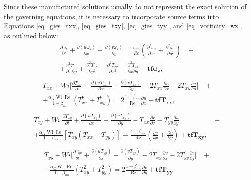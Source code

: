\documentclass[preprint, 12pt]{elsarticle}
\begin{document}
Since these manufactured solutions usually do not represent the exact solution of the governing equations, it is necessary to incorporate source terms into Equations \eqref{eq_gies_txx}, \eqref{eq_gies_txy}, \eqref{eq_gies_tyy}, and \eqref{eq_vorticity_wz}, as outlined below:
\begin{gather}
    \begin{aligned}
        \frac{\partial \omega_{z}}{\partial t} + \frac{\partial (u\omega_{z})}{\partial x} + \frac{\partial (v\omega_{z})}{\partial y} = \frac{\beta_{nn}}{Re}\left(\frac{\partial^{2} \omega_{z}}{\partial x^{2}} + \frac{\partial^{2} \omega_{z}}{\partial y^{2}}\right) &~+ \\ + \frac{\partial^{2}T_{xx}}{\partial x^{}\partial y^{}} + \frac{\partial^{2}T_{xy}}{\partial y^{2}} - \frac{\partial^{2}T_{xy}}{\partial x^{2}} - \frac{\partial^{2}T_{yy}}{\partial x^{}\partial y^{}} + \mathbf{tf}\boldsymbol{\omega}_{\mathbf{z}},\label{eq_vortic_corrent_MMS}
    \end{aligned}
\end{gather}
\begin{gather}
    \begin{aligned}
        T_{xx} + Wi\bigg[\frac{\partial T_{xx}}{\partial t} + \frac{\partial (uT_{xx})}{\partial x} + \frac{\partial (vT_{xx})}{\partial y} - 2T_{xx}\frac{\partial u}{\partial x} - 2T_{xy}\frac{\partial u}{\partial y}\bigg] &~+ \\ + \frac{\alpha_{G}\operatorname{Wi}\operatorname{Re}}{1-\beta_{nn}}\left(T_{xx}^{2} + T_{xy}^{2}\right) = 2\frac{1-\beta_{nn}}{\operatorname{Re}}\frac{\partial u}{\partial x} + \mathbf{tfT_{xx}},\label{eq_gies_txx_source_term_1}
    \end{aligned}
\end{gather}
\begin{gather}
    \begin{aligned}
        T_{xy} + Wi\bigg[\frac{\partial T_{xy}}{\partial t} + \frac{\partial (uT_{xy})} {\partial x} + \frac{\partial (vT_{xy})}{\partial y} - T_{xx}\frac{\partial v}{\partial x} - T_{yy}\frac{\partial u}{\partial y}\bigg] &~+ \\ + \frac{\alpha_{G}\operatorname{Wi}\operatorname{Re}}{1-\beta_{nn}}\left[T_{xy}\left(T_{xx} + T_{yy}\right)\right] = \frac{1-\beta_{nn}}{\operatorname{Re}}\left(\frac{\partial v}{\partial x} + \frac{\partial u}{\partial y}\right)+ \mathbf{tfT_{xy}},\label{eq_gies_txy_source_term_1}
    \end{aligned}
\end{gather}
\begin{gather}
    \begin{aligned}
        T_{yy} + Wi\bigg[\frac{\partial T_{yy}}{\partial t} + \frac{\partial (uT_{yy})}{\partial x} + \frac{\partial (vT_{yy})}{\partial y} - 2T_{xy}\frac{\partial v}{\partial x} - 2T_{yy}\frac{\partial v}{\partial y}\bigg] &~+ \\ + \frac{\alpha_{G}\operatorname{Wi}\operatorname{Re}}{1-\beta_{nn}}\left(T_{xy}^{2} + T_{yy}^{2}\right) = 2\frac{1-\beta_{nn}}{\operatorname{Re}}\frac{\partial v}{\partial y}+ \mathbf{tfT_{yy}}, \label{eq_gieskus_tyy_source_term_1}
    \end{aligned}
\end{gather}
\end{document}

